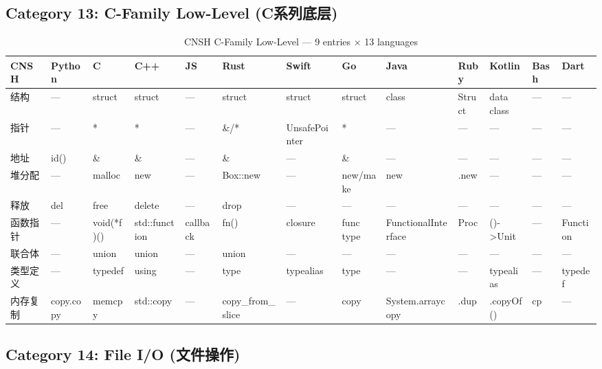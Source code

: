 \subsection{Category 13: C-Family Low-Level (C系列底层)}
\label{app:ren-clow}

\begin{table}[h]
\centering
\caption{CNSH C-Family Low-Level — 9 entries × 13 languages}
\renewcommand{\arraystretch}{1.2}
\fontsize{8}{10}\selectfont
\begin{tabular}{lllllllllllll}
\toprule
\textbf{CNSH} & \textbf{Python} & \textbf{C} & \textbf{C++} & \textbf{JS} & \textbf{Rust} & \textbf{Swift} & \textbf{Go} & \textbf{Java} & \textbf{Ruby} & \textbf{Kotlin} & \textbf{Bash} & \textbf{Dart} \\
\midrule
结构 & — & struct & struct & — & struct & struct & struct & class & Struct & data class & — & — \\
指针 & — & * & * & — & \&/* & UnsafePointer & * & — & — & — & — & — \\
地址 & id() & \& & \& & — & \& & — & \& & — & — & — & — & — \\
堆分配 & — & malloc & new & — & Box::new & — & new/make & new & .new & — & — & — \\
释放 & del & free & delete & — & drop & — & — & — & — & — & — & — \\
函数指针 & — & void(*f)() & std::function & callback & fn() & closure & func type & FunctionalInterface & Proc & ()->Unit & — & Function \\
联合体 & — & union & union & — & union & — & — & — & — & — & — & — \\
类型定义 & — & typedef & using & — & type & typealias & type & — & — & typealias & — & typedef \\
内存复制 & copy.copy & memcpy & std::copy & — & copy\_from\_slice & — & copy & System.arraycopy & .dup & .copyOf() & cp & — \\
\bottomrule
\end{tabular}
\end{table}

\subsection{Category 14: File I/O (文件操作)}
\label{app:ren-fileio}

